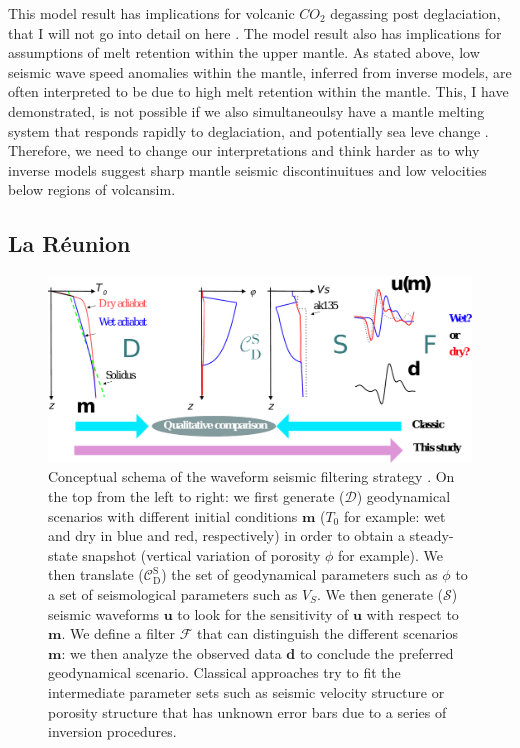 This model result has implications for volcanic $CO_{2}$ degassing post deglaciation, that I will not go into detail on here \citep[see][]{armitage-etal-grl-2019}. The model result also has implications for assumptions of melt retention within the upper mantle. As stated above, low seismic wave speed anomalies within the mantle, inferred from inverse models, are often interpreted to be due to high melt retention within the mantle. This, I have demonstrated, is not possible if we also simultaneoulsy have a mantle melting system that responds rapidly to deglaciation, and potentially sea leve change \citep{huybers-2009}. Therefore, we need to change our interpretations and think harder as to why inverse models suggest sharp mantle seismic discontinuitues and low velocities below regions of volcansim.

\subsection{La Réunion}

\begin{figure}
\centering
\includegraphics[width=\textwidth]{figures/ch2-schema.pdf}
\caption{Conceptual schema of the waveform seismic filtering strategy \citep[see][]{franken-etal-2020}. On the top from the left to right: we first generate ($\mathcal{D}$)  geodynamical scenarios with different initial conditions $\mathbf{m}$ ($T_0$ for example: wet and dry in blue and red, respectively) in order to obtain a steady-state snapshot (vertical variation of porosity $\phi$ for example). We then translate  ($\mathcal{C}_\mathrm{D}^\mathrm{S}$) the set of geodynamical parameters such as $\phi$ to a set of seismological parameters such as $V_S$. We then generate ($\mathcal{S}$) seismic waveforms $\mathbf{u}$ to look for the sensitivity of $\mathbf{u}$ with respect to $\mathbf{m}$. We define a filter $\mathcal{F}$ that can distinguish the different scenarios $\mathbf{m}$: we then analyze the observed data $\mathbf{d}$ to conclude the preferred geodynamical scenario. Classical approaches try to fit the intermediate parameter sets such as seismic velocity structure or porosity structure that has unknown error bars due to a series of inversion procedures.}
\label{fg:inversion}
\end{figure}

